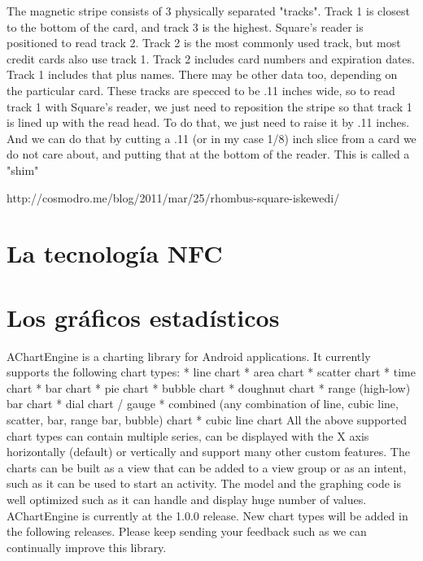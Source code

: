 The magnetic stripe consists of 3 physically separated "tracks". Track 1 is closest to the bottom of the card, and track 3 is the highest. Square's reader is positioned to read track 2. Track 2 is the most commonly used track, but most credit cards also use track 1. Track 2 includes card numbers and expiration dates. Track 1 includes that plus names. There may be other data too, depending on the particular card. These tracks are specced to be .11 inches wide, so to read track 1 with Square's reader, we just need to reposition the stripe so that track 1 is lined up with the read head. To do that, we just need to raise it by .11 inches. And we can do that by cutting a .11 (or in my case 1/8) inch slice from a card we do not care about, and putting that at the bottom of the reader. This is called a "shim"

http://cosmodro.me/blog/2011/mar/25/rhombus-square-iskewedi/


\section{La tecnolog\'ia \ac{NFC}}
\label{sec:tpv.nfc}


\section{Los gr\'aficos estad\'isticos}
\label{sec:tpv.graphs}

AChartEngine is a charting library for Android applications. It currently supports the following chart types:
   * line chart
   * area chart
   * scatter chart
   * time chart
   * bar chart
   * pie chart
   * bubble chart
   * doughnut chart
   * range (high-low) bar chart
   * dial chart / gauge
   * combined (any combination of line, cubic line, scatter, bar, range bar, bubble) chart
   * cubic line chart
All the above supported chart types can contain multiple series, can be displayed with the X axis horizontally (default) or vertically and support many other custom features. The charts can be built as a view that can be added to a view group or as an intent, such as it can be used to start an activity.
The model and the graphing code is well optimized such as it can handle and display huge number of values.
AChartEngine is currently at the 1.0.0 release. New chart types will be added in the following releases. Please keep sending your feedback such as we can continually improve this library.

